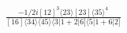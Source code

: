 \documentclass[varwidth, border=5pt]{standalone}
\begin{document}
\begin{my}
$\begin{gathered}
\scriptscriptstyle\frac{-1/2i[12]^3\langle23\rangle[23]\langle35\rangle^4}{[16]\langle34\rangle\langle45\rangle\langle3|1+2|6]\langle5|1+6|2]}
\end{gathered}$
\end{my}
\end{document}
